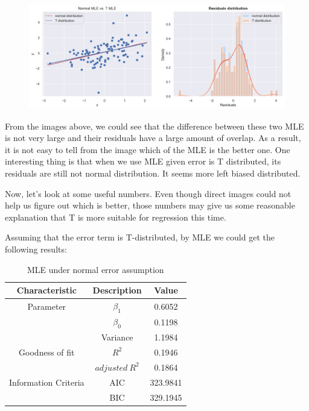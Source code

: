 \documentclass[11pt,en]{elegantpaper}
\begin{document}
\begin{figure}[h] 
    \centering 
    \includegraphics[width=1\textwidth]{./image/MLE} 
\end{figure}

From the images above, we could see that the difference between these two MLE is not very large 
and their residuals have a large amount of overlap. As a result, it is not easy to tell from 
the image which of the MLE is the better one. One interesting thing is that when we use MLE given 
error is T distributed, its residuals are still not normal distribution. It seems more left biased
distributed.

Now, let's look at some useful numbers. Even though direct images could not help us figure out which 
is better, those numbers may give us some reasonable explanation that T is more suitable for regression
this time.

Assuming that the error term is T-distributed, by MLE we could get the following results:

\begin{table}[h]
    \centering
    \caption{MLE under normal error assumption}
    \label{table5}
    \begin{tabular}{@{}ccc@{}}
        \toprule
        \textbf{Characteristic} & \textbf{Description} & \textbf{Value}\\
        \midrule
        Parameter & $\beta_1$ & 0.6052 \\
        & $\beta_0$ & 0.1198 \\
        & Variance  & 1.1984 \\
        Goodness of fit & $R^2$ & 0.1946 \\
        & $adjusted\  R^2$ & 0.1864 \\
        Information Criteria & AIC & 323.9841 \\
        & BIC & 329.1945\\
        \bottomrule
    \end{tabular}
\end{table}
\end{document}
